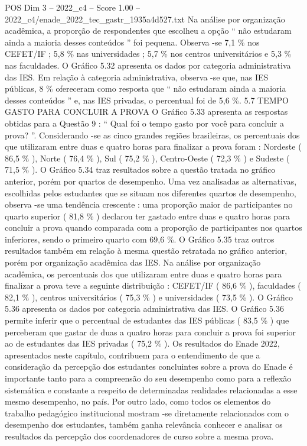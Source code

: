 \begin{textsample}{POS Dim 3 – 2022\_c4 – Score 1.00 – 2022\_c4/enade\_2022\_tec\_gastr\_1935a4d527.txt}
Na análise por organização acadêmica, a proporção de respondentes que escolheu a opção “ não estudaram ainda a maioria desses conteúdos ” foi pequena.
Observa -se 7,1 \% nos CEFET/IF ; 5,8 \% nas universidades ; 5,7 \% nos centros universitários e 5,3 \% nas faculdades.
O Gráfico 5.32 apresenta os dados por categoria administrativa das IES.
Em relação à categoria administrativa, observa -se que, nas IES públicas, 8 \% ofereceram como resposta que “ não estudaram ainda a maioria desses conteúdos ” e, nas IES privadas, o percentual foi de 5,6 \%. 5.7 TEMPO GASTO PARA CONCLUIR A PROVA O Gráfico 5.33 apresenta as respostas obtidas para a Questão 9 : “ Qual foi o tempo gasto por você para concluir a prova? ”.
Considerando -se as cinco grandes regiões brasileiras, os percentuais dos que utilizaram entre duas e quatro horas para finalizar a prova foram : Nordeste ( 86,5 \% ), Norte ( 76,4 \% ), Sul ( 75,2 \% ), Centro-Oeste ( 72,3 \% ) e Sudeste ( 71,5 \% ).
O Gráfico 5.34 traz resultados sobre a questão tratada no gráfico anterior, porém por quartos de desempenho.
Uma vez analisadas as alternativas, escolhidas pelos estudantes que se situam nos diferentes quartos de desempenho, observa -se uma tendência crescente : uma proporção maior de participantes no quarto superior ( 81,8 \% ) declarou ter gastado entre duas e quatro horas para concluir a prova quando comparada com a proporção de participantes nos quartos inferiores, sendo o primeiro quarto com 69,6 \%.
O Gráfico 5.35 traz outros resultados também em relação à mesma questão retratada no gráfico anterior, porém por organização acadêmica das IES.
Na análise por organização acadêmica, os percentuais dos que utilizaram entre duas e quatro horas para finalizar a prova teve a seguinte distribuição : CEFET/IF ( 86,6 \% ), faculdades ( 82,1 \% ), centros universitários ( 75,3 \% ) e universidades ( 73,5 \% ).
O Gráfico 5.36 apresenta os dados por categoria administrativa das IES.
O Gráfico 5.36 permite inferir que o percentual de estudantes das IES públicas ( 83,5 \% ) que perceberam que gastar de duas a quatro horas para concluir a prova foi superior ao de estudantes das IES privadas ( 75,2 \% ).
Os resultados do Enade 2022, apresentados neste capítulo, contribuem para o entendimento de que a consideração da percepção dos estudantes concluintes sobre a prova do Enade é importante tanto para a compreensão do seu desempenho como para a reflexão sistemática e constante a respeito de determinadas realidades relacionadas a esse mesmo desempenho, no país.
Por outro lado, como todos os elementos do trabalho pedagógico institucional mostram -se diretamente relacionados com o desempenho dos estudantes, também ganha relevância conhecer e analisar os resultados da percepção dos coordenadores de curso sobre a mesma prova.

\end{textsample}
